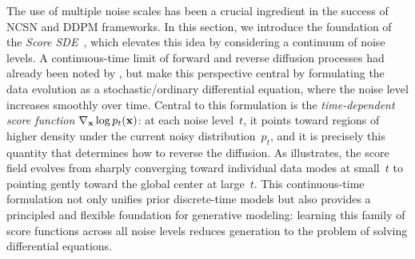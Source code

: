 
The use of multiple noise scales has been a crucial ingredient in the success of NCSN and DDPM frameworks. In this section, we introduce the foundation of the \emph{Score SDE}~\citep{song2020score}, which elevates this idea by considering a continuum of noise levels. A continuous-time limit of forward and reverse diffusion processes had already been noted by \citet{sohl2015deep}, but \citet{song2020score} make this perspective central by formulating the data evolution as a stochastic/ordinary differential equation, where the noise level increases smoothly over time. Central to this formulation is the \emph{time-dependent score function} $\nabla_{{\mathbf{x}}}\log p_t({\mathbf{x}})$: at each noise level~$t$, it points toward regions of higher density under the current noisy distribution~$p_t$, and it is precisely this quantity that determines how to reverse the diffusion. As  illustrates, the score field evolves from sharply converging toward individual data modes at small~$t$ to pointing gently toward the global center at large~$t$. This continuous-time formulation not only unifies prior discrete-time models but also provides a principled and flexible foundation for generative modeling: learning this family of score functions across all noise levels reduces generation to the problem of solving differential equations.






